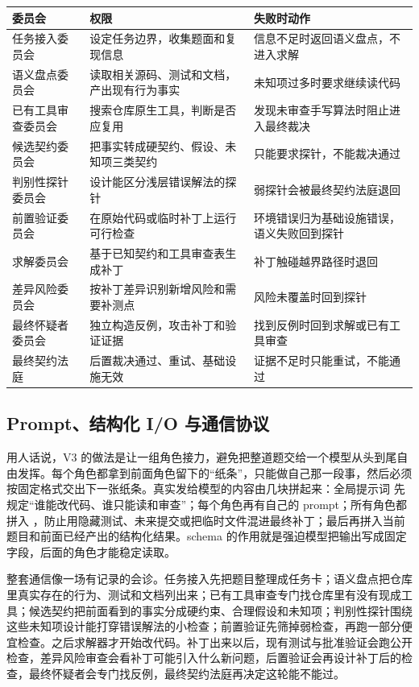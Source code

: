 \documentclass[11pt,fontset=fandol]{ctexart}
\begin{document}
\begin{longtable}{L{3.4cm}L{4.0cm}L{7.2cm}}
\toprule
委员会 & 权限 & 失败时动作 \\
\midrule
任务接入委员会 & 设定任务边界，收集题面和复现信息 & 信息不足时返回语义盘点，不进入求解 \\
语义盘点委员会 & 读取相关源码、测试和文档，产出现有行为事实 & 未知项过多时要求继续读代码 \\
已有工具审查委员会 & 搜索仓库原生工具，判断是否应复用 & 发现未审查手写算法时阻止进入最终裁决 \\
候选契约委员会 & 把事实转成硬契约、假设、未知项三类契约 & 只能要求探针，不能裁决通过 \\
判别性探针委员会 & 设计能区分浅层错误解法的探针 & 弱探针会被最终契约法庭退回 \\
前置验证委员会 & 在原始代码或临时补丁上运行可行检查 & 环境错误归为基础设施错误，语义失败回到探针 \\
求解委员会 & 基于已知契约和工具审查表生成补丁 & 补丁触碰越界路径时退回 \\
差异风险委员会 & 按补丁差异识别新增风险和需要补测点 & 风险未覆盖时回到探针 \\
最终怀疑者委员会 & 独立构造反例，攻击补丁和验证证据 & 找到反例时回到求解或已有工具审查 \\
最终契约法庭 & 后置裁决通过、重试、基础设施无效 & 证据不足时只能重试，不能通过 \\
\bottomrule
\end{longtable}

\subsection{Prompt、结构化 I/O 与通信协议}

用人话说，V3 的做法是让一组角色接力，避免把整道题交给一个模型从头到尾自由发挥。每个角色都拿到前面角色留下的“纸条”，只能做自己那一段事，然后必须按固定格式交出下一张纸条。真实发给模型的内容由几块拼起来：全局提示词  先规定“谁能改代码、谁只能读和审查”；每个角色再有自己的 prompt；所有角色都拼入 ，防止用隐藏测试、未来提交或把临时文件混进最终补丁；最后再拼入当前题目和前面已经产出的结构化结果。schema 的作用就是强迫模型把输出写成固定字段，后面的角色才能稳定读取。

整套通信像一场有记录的会诊。任务接入先把题目整理成任务卡；语义盘点把仓库里真实存在的行为、测试和文档列出来；已有工具审查专门找仓库里有没有现成工具；候选契约把前面看到的事实分成硬约束、合理假设和未知项；判别性探针围绕这些未知项设计能打穿错误解法的小检查；前置验证先筛掉弱检查，再跑一部分便宜检查。之后求解器才开始改代码。补丁出来以后，现有测试与批准验证会跑公开检查，差异风险审查会看补丁可能引入什么新问题，后置验证会再设计补丁后的检查，最终怀疑者会专门找反例，最终契约法庭再决定这轮能不能过。
\end{document}
